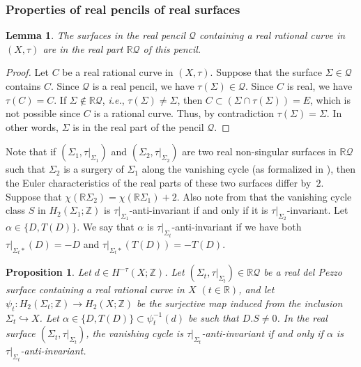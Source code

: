 \documentclass[11pt]{amsart}
\numberwithin{equation}{section}
\theoremstyle{definition}
\theoremstyle{plain}
\newtheorem{proposition}[definition]{Proposition}
\newtheorem{lemma}[definition]{Lemma}
\theoremstyle{remark}
\newcommand{\R}{\mathbb{R}}
\newcommand{\Z}{\mathbb{Z}}
\begin{document}
\subsubsection{Properties of real pencils of real surfaces}

 
\begin{lemma} \label{lem-surfaces.in.real.pencil}
The surfaces in the real pencil $\mathcal{Q}$ containing a real rational curve in $(X,\tau)$ are in the real part $\R \mathcal{Q}$ of this pencil.
\end{lemma}

\begin{proof}
  Let $C$ be a real rational curve in $(X,\tau)$. Suppose that the surface $\Sigma\in \mathcal{Q}$ contains $C$. Since $\mathcal{Q}$ is a real pencil, we have $\tau(\Sigma)\in \mathcal{Q}$. Since $C$ is real, we have $\tau(C)=C$.  If $\Sigma\notin \R \mathcal{Q}$, \textit{i.e.}, $\tau(\Sigma)\neq \Sigma$, then $C\subset (\Sigma\cap \tau(\Sigma))=E$, which is not possible since $C$ is a rational curve. Thus, by contradiction  $\tau(\Sigma)=\Sigma$. In other words, $\Sigma$ is in the real part of the pencil $\mathcal{Q}$.
\end{proof}

Note that if $(\Sigma_1,\tau|_{\Sigma_1})$ and $(\Sigma_2,\tau|_{\Sigma_2})$ are two real non-singular surfaces in $\R \mathcal{Q}$ such that $\Sigma_2$ is a surgery of $\Sigma_1$ along the vanishing cycle (as formalized in \cite{brugalle2018surgery}), then the Euler characteristics of the real parts of these two surfaces differ by~$2$. Suppose that $\chi(\R \Sigma_2)=\chi(\R \Sigma_1)+ 2$. Also note  from \cite{brugalle2018surgery} that the vanishing cycle class $S$ in $H_2(\Sigma_1;\Z)$ is $\tau|_{\Sigma_1}$-anti-invariant if and only if it is $\tau|_{\Sigma_2}$-invariant.  Let $\alpha \in \{D,T(D)\}$. We say that $\alpha$ is $\tau|_{\Sigma_t}$-anti-invariant if we have both
$\tau|_{\Sigma_t*}(D)=-D$ and
$\tau|_{\Sigma_t*}(T(D))=-T(D)$.

\begin{proposition} \label{prop-tau.vs.mu}
Let $d\in H^{-\tau}(X;\Z)$. Let $(\Sigma_t,\tau|_{\Sigma_t}) \in \R \mathcal{Q}$ be a real del Pezzo surface containing a real rational curve in $X$ $(t\in {\R})$, and let $\psi_t\colon  H_2(\Sigma_t;\mathbb{Z})\rightarrow H_2(X;\mathbb{Z})$ be the surjective map  induced from the inclusion $\Sigma_t\hookrightarrow X$. Let $\alpha \in \{D,T(D)\}\subset \psi_t^{-1}(d)$ be such that $D.S\neq 0$. In the real surface $(\Sigma_t,\tau|_{\Sigma_t})$, the vanishing cycle is $\tau|_{\Sigma_t}$-anti-invariant if and only if $\alpha$ is $\tau|_{\Sigma_t}$-anti-invariant.
\end{proposition}  
\end{document}
